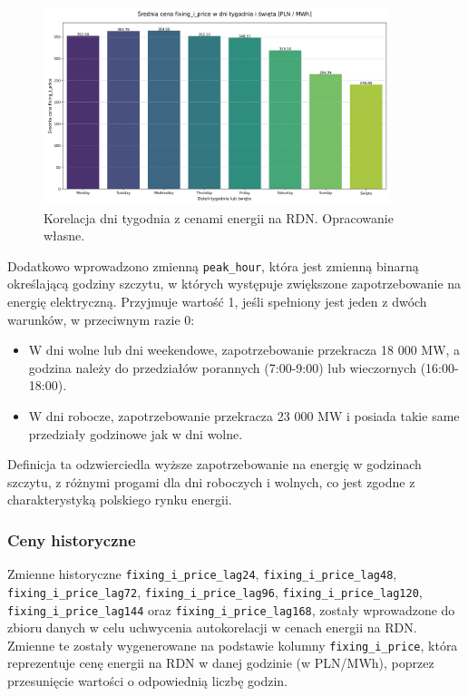 \begin{figure}[H]
    \centering
    \includegraphics[width=0.9\textwidth]{../plots/fixing_i_price_weekdays_holidays.png}
    \caption{Korelacja dni tygodnia z cenami energii na RDN. Opracowanie własne.}
    \label{fig:seasonal-correlation}
\end{figure}

Dodatkowo wprowadzono zmienną \texttt{peak\_hour}, która jest zmienną binarną określającą godziny szczytu, w których występuje zwiększone zapotrzebowanie na energię elektryczną. Przyjmuje wartość 1, jeśli spełniony jest jeden z dwóch warunków, w przeciwnym razie 0:
\begin{itemize}
    \item W dni wolne lub dni weekendowe, zapotrzebowanie przekracza 18 000 MW, a godzina należy do przedziałów porannych (7:00-9:00) lub wieczornych (16:00-18:00).
    \item W dni robocze, zapotrzebowanie przekracza 23 000 MW i posiada takie same przedziały godzinowe jak w dni wolne.
\end{itemize}
Definicja ta odzwierciedla wyższe zapotrzebowanie na energię w godzinach szczytu, z różnymi progami dla dni roboczych i wolnych, co jest zgodne z charakterystyką polskiego rynku energii.

\subsubsection{Ceny historyczne}
\label{subsec:historical_prices}
 
Zmienne historyczne \texttt{fixing\_i\_price\_lag24}, \texttt{fixing\_i\_price\_lag48}, \texttt{fixing\_i\_price\_lag72}, \texttt{fixing\_i\_price\_lag96}, \texttt{fixing\_i\_price\_lag120}, \texttt{fixing\_i\_price\_lag144} oraz \newline \texttt{fixing\_i\_price\_lag168}, zostały wprowadzone do zbioru danych w celu uchwycenia autokorelacji w cenach energii na RDN. Zmienne te zostały wygenerowane na podstawie kolumny \texttt{fixing\_i\_price}, która reprezentuje cenę energii na RDN w danej godzinie (w PLN/MWh), poprzez przesunięcie wartości o odpowiednią liczbę godzin. 

